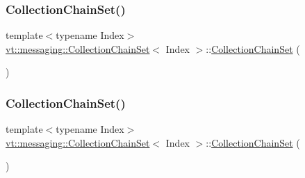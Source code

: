 \subsubsection{\texorpdfstring{Collection\+Chain\+Set()}{CollectionChainSet()}\hspace{0.1cm}{\footnotesize\ttfamily [2/4]}}
{\footnotesize\ttfamily template$<$typename Index$>$ \\
\hyperlink{classvt_1_1messaging_1_1_collection_chain_set}{vt\+::messaging\+::\+Collection\+Chain\+Set}$<$ Index $>$\+::\hyperlink{classvt_1_1messaging_1_1_collection_chain_set}{Collection\+Chain\+Set} (\begin{DoxyParamCaption}\item[{const \hyperlink{classvt_1_1messaging_1_1_collection_chain_set}{Collection\+Chain\+Set}$<$ Index $>$ \&}]{ }\end{DoxyParamCaption})\hspace{0.3cm}{\ttfamily [delete]}}

\mbox{\label{classvt_1_1messaging_1_1_collection_chain_set_a21be566436c86fa59a02a1bd073a9e48}} 
\subsubsection{\texorpdfstring{Collection\+Chain\+Set()}{CollectionChainSet()}\hspace{0.1cm}{\footnotesize\ttfamily [3/4]}}
{\footnotesize\ttfamily template$<$typename Index$>$ \\
\hyperlink{classvt_1_1messaging_1_1_collection_chain_set}{vt\+::messaging\+::\+Collection\+Chain\+Set}$<$ Index $>$\+::\hyperlink{classvt_1_1messaging_1_1_collection_chain_set}{Collection\+Chain\+Set} (\begin{DoxyParamCaption}\item[{\hyperlink{classvt_1_1messaging_1_1_collection_chain_set}{Collection\+Chain\+Set}$<$ Index $>$ \&\&}]{ }\end{DoxyParamCaption})\hspace{0.3cm}{\ttfamily [delete]}}

\mbox{\label{classvt_1_1messaging_1_1_collection_chain_set_a307795a4cfc6c794ea3979655a97be91}} 
